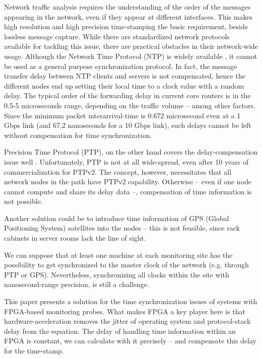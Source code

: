\documentclass[journal]{IEEEtran}
\begin{document}
Network traffic analysis requires the understanding of the order of the messages appearing in the network, even if they appear at different interfaces. This makes high resolution and high precision time-stamping the basic requirement, beside lossless message capture. 
While there are standardized network protocols available for tackling this issue, there are practical obstacles in their network-wide usage. Although the Network Time Protocol (NTP) is widely available \cite{NTP_book}, it cannot be used as a general purpose synchronization protocol. In fact, the message transfer delay between NTP clients and servers is not compensated, hence the different nodes end up setting their local time to a clock value with a random delay. The typical order of the forwarding delay in current core routers is in the 0.5-5 microseconds range, depending on the traffic volume -- among other factors. Since the minimum packet interarrival-time is 0.672 microsecond even at a 1 Gbps link (and 67.2 nanoseconds for a 10 Gbps link), such delays cannot be left without compensation for time synchronization.

Precision Time Protocol (PTP), on the other hand covers the delay-compensation issue well \cite{PTP_standard}. Unfortunately, PTP is not at all wide-spread, even after 10 years of commercialization for PTPv2. The concept, however, necessitates that all network nodes in the path have PTPv2 capability. Otherwise -- even if one node cannot compute and share its delay data --, compensation of time information is not possible.

Another solution could be to introduce time information of GPS (Global Positioning System) satellites into the nodes -- this is not feasible, since rack cabinets in server rooms lack the line of sight.

We can suppose that at least one machine at each monitoring site has the possibility to get synchronized to the master clock of the network (e.g. through PTP or GPS). Nevertheless, synchronizing all clocks within the site with nanosecond-range precision, is still a challenge.

This paper presents a solution for the time synchronization issues of systems with FPGA-based monitoring probes. What makes FPGA a key player here is that hardware-acceleration removes the jitter of operating system and protocol-stack delay from the equation. The delay of handling time information within an FPGA is constant, we can calculate with it precisely -- and compensate this delay for the time-stamp.
\end{document}
